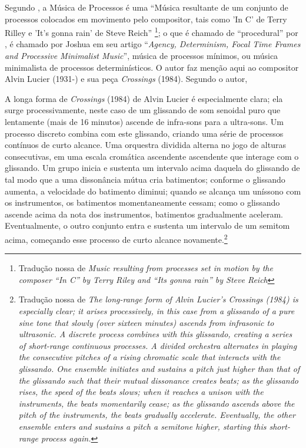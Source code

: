 Segundo , a Música de Processos é uma ``Música resultante de um conjunto de processos colocados em movimento pelo compositor, tais como  'In C' de Terry Rilley e 'It's gonna rain' de Steve Reich'' \footnote{Tradução nossa de \emph{Music resulting from processes set in motion by the composer “In C” by Terry Riley and “Its gonna rain” by Steve Reich}}; o que é chamado de ``procedural'' por , é chamado por Joshua  em seu artigo ``\emph{Agency, Determinism, Focal Time Frames and Processive Minimalist Music}'', música de processos mínimos, ou música minimalista de processos determinísticos. O autor faz menção aqui ao compositor Alvin Lucier (1931-) e sua peça \emph{Crossings} (1984). Segundo o autor,

\begin{citacao}
A longa forma de \emph{Crossings} (1984) de Alvin Lucier é especialmente clara; ela surge processivamente, neste caso de um glissando de som senoidal puro que lentamente (mais de 16 minutos) ascende de infra-sons para a ultra-sons. Um processo discreto combina com este glissando, criando uma série de processos contínuos de curto alcance. Uma orquestra dividida alterna no jogo de alturas consecutivas, em uma escala cromática ascendente ascendente que interage com o glissando. Um grupo inicia e sustenta um intervalo acima daquela do glissando de tal modo que a uma dissonância mútua cria batimentos; conforme o glissando aumenta, a velocidade do batimento diminui; quando se alcança um uníssono com os instrumentos, os batimentos momentaneamente cessam; como o glissando ascende acima da nota dos instrumentos, batimentos gradualmente aceleram. Eventualmente, o outro conjunto entra e sustenta um intervalo de um semitom acima, começando esse processo de curto alcance novamente.\cite[p.~128]{mailman_agency_2013}\footnote{Tradução nossa de \emph{The long-range form of Alvin Lucier’s Crossings (1984) is especially clear; it arises processively, in this case from a glissando of a pure sine tone that slowly (over sixteen minutes) ascends from infrasonic to ultrasonic. A discrete process combines with this glissando, creating a series of short-range continuous processes. A divided orchestra alternates in playing the consecutive pitches of a rising chromatic scale that interacts with the glissando. One ensemble initiates and sustains a pitch just higher than that of the glissando such that their mutual dissonance creates beats; as the glissando rises, the speed of the beats slows; when it reaches a unison with the instruments, the beats momentarily cease; as the glissando ascends above the pitch of the instruments, the beats gradually accelerate. Eventually, the other ensemble enters and sustains a pitch a semitone higher, starting this short-range process again.}}
\end{citacao}

